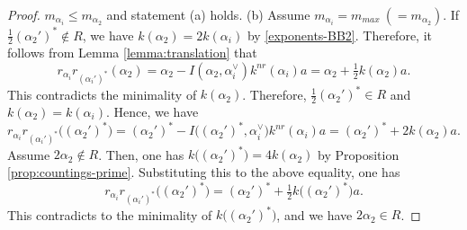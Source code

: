 \documentclass[11pt]{amsart}
\begin{document}
{{\begin{proof}
$m_{\alpha_i}\leq m_{\alpha_2}$ and statement (a) holds. 
\vskip 3mm
\noindent
(b) Assume $m_{\alpha_i}=m_{max}\ (=m_{\alpha_2})$. 
If $\tfrac12 (\alpha_2')^\ast\not\in R$, 
we have $k(\alpha_2)=2k(\alpha_i)$ by \eqref{exponents-BB2}. Therefore, it follows
from Lemma \ref{lemma:translation} that
\[ r_{\alpha_i}r_{(\alpha_i')^\ast}
(\alpha_2)=\alpha_2-I(\alpha_2,\alpha_i^\vee)k^{nr}(\alpha_i)a=\alpha_2+
\tfrac12 k(\alpha_2)a.\]
This contradicts the minimality of $k(\alpha_2)$. Therefore, 
$\tfrac12 (\alpha_2')^\ast\in R$ and $k(\alpha_2)=k(\alpha_i)$. Hence, we have
\[ r_{\alpha_i}r_{(\alpha_i')^\ast}\big((\alpha_2')^\ast\big)
=(\alpha_2')^\ast-I\big((\alpha_2')^\ast,\alpha_i^\vee\big)k^{nr}(\alpha_i)a
=(\alpha_2')^\ast+ 2k(\alpha_2)a.\]
Assume $2\alpha_2\not\in R$. 
Then, one has $k\big((\alpha_2')^\ast\big)=4k(\alpha_2)$ by 
Proposition \ref{prop:countings-prime}. Substituting this to the above equality, one has
\[ r_{\alpha_i}r_{(\alpha_i')^\ast}
\big((\alpha_2')^\ast\big)=(\alpha_2')^\ast+ \tfrac12 k\big((\alpha_2')^\ast\big)a.\]
This contradicts to the minimality of $k\big((\alpha_2')^\ast\big)$, 
and we have $2\alpha_2\in R$. 


\end{proof}}}
\end{document}
